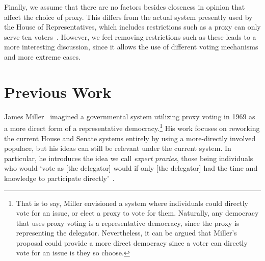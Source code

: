 Finally, we assume that there are no factors besides closeness in opinion that affect
the choice of proxy.
This differs from the actual system presently used by the House of Representatives,
which includes restrictions such as a proxy can only serve ten voters~\cite{CERP2020}.
However, we feel removing restrictions such as these leads to a more interesting
discussion, since it allows the use of different voting mechanisms and more extreme
cases.


\section{Previous Work}\label{sec:previous-work}
James Miller~\cite{Miller1969} imagined a governmental system utilizing proxy voting
in 1969 as a more direct form of a representative democracy.\footnote{
    That is to say, Miller envisioned a system where individuals could directly vote
    for an issue, or elect a proxy to vote for them.
    Naturally, any democracy that uses proxy voting is a representative democracy,
    since the proxy is representing the delegator.
    Nevertheless, it can be argued that Miller's proposal could provide a more direct
    democracy since a voter can directly vote for an issue is they so choose.
}
His work focuses on reworking the current House and Senate systems entirely by using a
more-directly involved populace, but his ideas can still be relevant under the current
system.
In particular, he introduces the idea we call \textit{expert proxies},
those being individuals who would `vote as [the delegator] would if only
[the delegator] had the time and knowledge to participate directly'~\cite{Miller1969}.

